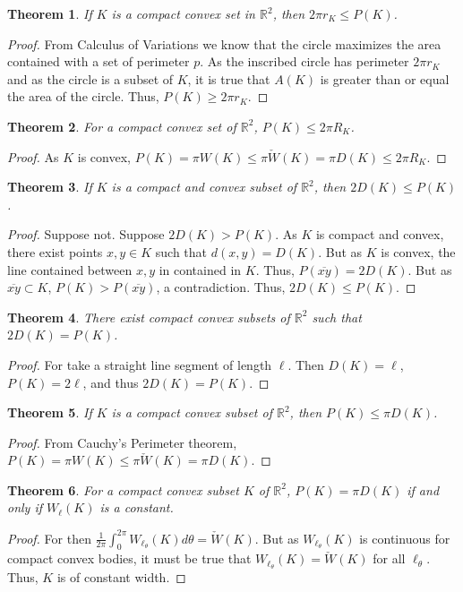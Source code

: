 \documentclass[oneside]{book}
\newtheorem{theorem}{Theorem}[section]
\theoremstyle{definition}
\begin{document}
\begin{theorem}
If $K$ is a compact convex set in $\mathbb{R}^2$, then $2\pi r_K \leq P(K)$.
\end{theorem}
\begin{proof}
From Calculus of Variations we know that the circle maximizes the area contained with a set of perimeter $p$. As the inscribed circle has perimeter $2\pi r_K$ and as the circle is a subset of $K$, it is true that $A(K)$ is greater than or equal the area of the circle. Thus, $P(K)\geq 2\pi r_K$.
\end{proof}

\begin{theorem}
For a compact convex set of $\mathbb{R}^2$, $P(K) \leq 2\pi R_K$.
\end{theorem}
\begin{proof}
As $K$ is convex, $P(K) = \pi W(K) \leq \pi \check{W}(K) = \pi D(K) \leq 2\pi R_K$.
\end{proof}

\begin{theorem}
If $K$ is a compact and convex subset of $\mathbb{R}^2$, then $2D(K)\leq P(K)$.
\end{theorem}
\begin{proof}
Suppose not. Suppose $2D(K) >P(K)$. As $K$ is compact and convex, there exist points $x,y\in K$ such that $d(x,y) = D(K)$. But as $K$ is convex, the line contained between $x,y$ in contained in $K$. Thus, $P(\overline{xy}) = 2D(K)$. But as $\overline{xy}\subset K$, $P(K)>P(\overline{xy})$, a contradiction. Thus, $2D(K) \leq P(K)$.
\end{proof}

\begin{theorem}
There exist compact convex subsets of $\mathbb{R}^2$ such that $2D(K) = P(K)$.
\end{theorem}
\begin{proof}
For take a straight line segment of length $\ell$. Then $D(K) = \ell$, $P(K) = 2\ell$, and thus $2D(K) = P(K)$.
\end{proof}

\begin{theorem}
If $K$ is a compact convex subset of $\mathbb{R}^2$, then $P(K) \leq \pi D(K)$.
\end{theorem}
\begin{proof}
From Cauchy's Perimeter theorem, $P(K) = \pi W(K) \leq \pi \check{W}(K) = \pi D(K)$.
\end{proof}

\begin{theorem}
For a compact convex subset $K$ of $\mathbb{R}^2$, $P(K) = \pi D(K)$ if and only if $W_{\ell}(K)$ is a constant.
\end{theorem}
\begin{proof}
For then $\frac{1}{2\pi} \int_{0}^{2\pi} W_{\ell_{\theta}}(K) d\theta = \check{W}(K)$. But as $W_{\ell_{\theta}}(K)$ is continuous for compact convex bodies, it must be true that $W_{\ell_{\theta}}(K) = \check{W}(K)$ for all $\ell_{\theta}$. Thus, $K$ is of constant width.
\end{proof}
\end{document}
